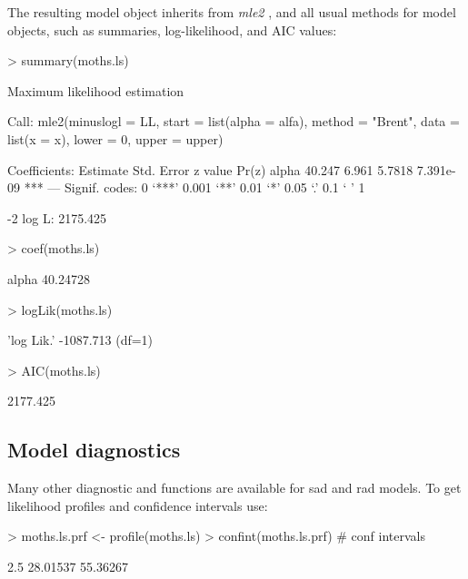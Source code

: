 \documentclass[11pt, A4]{article}
\begin{document}
The resulting model object inherits from \emph{mle2}
\citep{Bolkerbbmle}, and all usual methods for model objects, such as
summaries, log-likelihood, and AIC values:
\begin{Schunk}
\begin{Sinput}
> summary(moths.ls)
\end{Sinput}
\begin{Soutput}
Maximum likelihood estimation

Call:
mle2(minuslogl = LL, start = list(alpha = alfa), method = "Brent", 
    data = list(x = x), lower = 0, upper = upper)

Coefficients:
      Estimate Std. Error z value     Pr(z)    
alpha   40.247      6.961  5.7818 7.391e-09 ***
---
Signif. codes:  
0 ‘***’ 0.001 ‘**’ 0.01 ‘*’ 0.05 ‘.’ 0.1 ‘ ’ 1

-2 log L: 2175.425 
\end{Soutput}
\begin{Sinput}
> coef(moths.ls)
\end{Sinput}
\begin{Soutput}
   alpha 
40.24728 
\end{Soutput}
\begin{Sinput}
> logLik(moths.ls)
\end{Sinput}
\begin{Soutput}
'log Lik.' -1087.713 (df=1)
\end{Soutput}
\begin{Sinput}
> AIC(moths.ls)
\end{Sinput}
\begin{Soutput}
[1] 2177.425
\end{Soutput}
\end{Schunk}


\subsection{Model diagnostics}
\label{sec:model-diagnostics}
Many other diagnostic and functions are available for sad and rad models. 
To get likelihood profiles and confidence intervals use:


\begin{Schunk}
\begin{Sinput}
> moths.ls.prf <- profile(moths.ls)
> confint(moths.ls.prf) # conf intervals
\end{Sinput}
\begin{Soutput}
   2.5 %
28.01537 55.36267 
\end{Soutput}
\end{Schunk}
\end{document}
